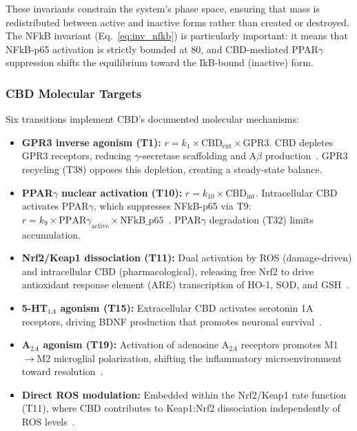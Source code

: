 \documentclass[10pt,letterpaper]{article}
\begin{document}
These invariants constrain the system's phase space, ensuring that mass is redistributed between active and inactive forms rather than created or destroyed. The NFkB invariant (Eq.~\ref{eq:inv_nfkb}) is particularly important: it means that NFkB-p65 activation is strictly bounded at 80, and CBD-mediated PPAR$\gamma$ suppression shifts the equilibrium toward the IkB-bound (inactive) form.

\subsubsection{CBD Molecular Targets}

Six transitions implement CBD's documented molecular mechanisms:

\begin{itemize}
\item \textbf{GPR3 inverse agonism (T1):} $r = k_1 \times \text{CBD}_{\text{ext}} \times \text{GPR3}$. CBD depletes GPR3 receptors, reducing $\gamma$-secretase scaffolding and A$\beta$ production~\cite{huang2015}. GPR3 recycling (T38) opposes this depletion, creating a steady-state balance.

\item \textbf{PPAR$\gamma$ nuclear activation (T10):} $r = k_{10} \times \text{CBD}_{\text{int}}$. Intracellular CBD activates PPAR$\gamma$, which suppresses NFkB-p65 via T9: $r = k_9 \times \text{PPAR}\gamma_{\text{active}} \times \text{NFkB\_p65}$~\cite{esposito2011}. PPAR$\gamma$ degradation (T32) limits accumulation.

\item \textbf{Nrf2/Keap1 dissociation (T11):} Dual activation by ROS (damage-driven) and intracellular CBD (pharmacological), releasing free Nrf2 to drive antioxidant response element (ARE) transcription of HO-1, SOD, and GSH~\cite{casares2020}.

\item \textbf{5-HT$_{1A}$ agonism (T15):} Extracellular CBD activates serotonin 1A receptors, driving BDNF production that promotes neuronal survival~\cite{russo2005}.

\item \textbf{A$_{2A}$ agonism (T19):} Activation of adenosine A$_{2A}$ receptors promotes M1$\to$M2 microglial polarization, shifting the inflammatory microenvironment toward resolution~\cite{mecha2013}.

\item \textbf{Direct ROS modulation:} Embedded within the Nrf2/Keap1 rate function (T11), where CBD contributes to Keap1:Nrf2 dissociation independently of ROS levels~\cite{booz2011}.
\end{itemize}
\end{document}

